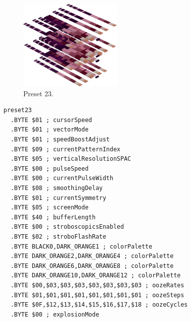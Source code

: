 \vspace*{0.5cm}
\begin{minipage}[b]{0.48\linewidth}
\begin{figure}[H]                                                          
  \centering                                                             
  \begin{adjustbox}{width=5cm,center}                                   
  \includegraphics[width=5cm]{src/colorspace_presets/preset23-45.png}%
  \end{adjustbox}                                                        
\caption*{Preset 23.}                                           
\end{figure}                                                               
\end{minipage}
\hspace{0.1cm}
\begin{minipage}[b]{0.48\linewidth}                                                                         
\begin{lstlisting}[basicstyle=\ttfamily\tiny]
preset23
  .BYTE $01 ; cursorSpeed
  .BYTE $01 ; vectorMode
  .BYTE $01 ; speedBoostAdjust
  .BYTE $09 ; currentPatternIndex
  .BYTE $05 ; verticalResolutionSPAC
  .BYTE $00 ; pulseSpeed
  .BYTE $00 ; currentPulseWidth
  .BYTE $08 ; smoothingDelay
  .BYTE $01 ; currentSymmetry
  .BYTE $05 ; screenMode
  .BYTE $40 ; bufferLength
  .BYTE $00 ; stroboscopicsEnabled
  .BYTE $02 ; stroboFlashRate
  .BYTE BLACK0,DARK_ORANGE1 ; colorPalette
  .BYTE DARK_ORANGE2,DARK_ORANGE4 ; colorPalette
  .BYTE DARK_ORANGE6,DARK_ORANGE8 ; colorPalette
  .BYTE DARK_ORANGE10,DARK_ORANGE12 ; colorPalette
  .BYTE $00,$03,$03,$03,$03,$03,$03,$03 ; oozeRates
  .BYTE $01,$01,$01,$01,$01,$01,$01,$01 ; oozeSteps
  .BYTE $0F,$12,$13,$14,$15,$16,$17,$18 ; oozeCycles
  .BYTE $00 ; explosionMode
\end{lstlisting}
\end{minipage}


